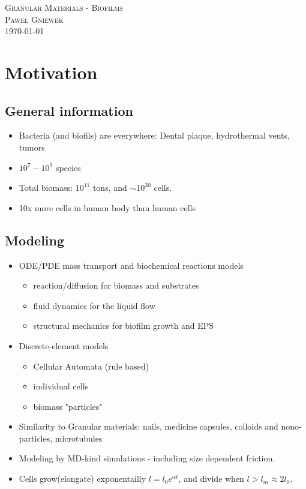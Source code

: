 \documentclass[10pt,a4paper]{article}
\begin{document}
\begin{center}
\textsc{\Large Granular Materials - Biofilms}\\[1.0cm]
\textsc{\LARGE Pawel Gniewek}\\[1.0cm]
\vspace{0.5cm}
\today

\newpage
\tableofcontents
\end{center}

\newpage

\section{Motivation}
\subsection{General information}
\begin{itemize}
 \item Bacteria (and biofils) are everywhere: Dental plaque, hydrothermal vents, tumors
 \item $10^7 - 10^9$ species
 \item Total biomass: $10^{11}$ tons, and $\sim 10^{30}$ cells.
 \item 10x more cells in human body than human cells
\end{itemize}

\subsection{Modeling}
\begin{itemize}
 \item ODE/PDE mass transport and biochemical reactions models
 \begin{itemize}
  \item reaction/diffusion for biomass and substrates
  \item fluid dynamics for the liquid flow
  \item structural mechanics for biofilm growth and EPS
 \end{itemize}
 \item Discrete-element models
  \begin{itemize}
  \item Cellular Automata (rule based)
  \item individual cells
  \item biomass "particles"
 \end{itemize}
 \item Similarity to Granular materials: nails, medicine capsules, colloids and nono-particles, microtubules
 \item Modeling by MD-kind simulations - including size dependent friction.
 \item Cells grow(elongate) exponentailly $ l = l_0 e^{\alpha t}$, and divide when $l > l_m \approx 2l_0$.
\end{itemize}
\end{document}
